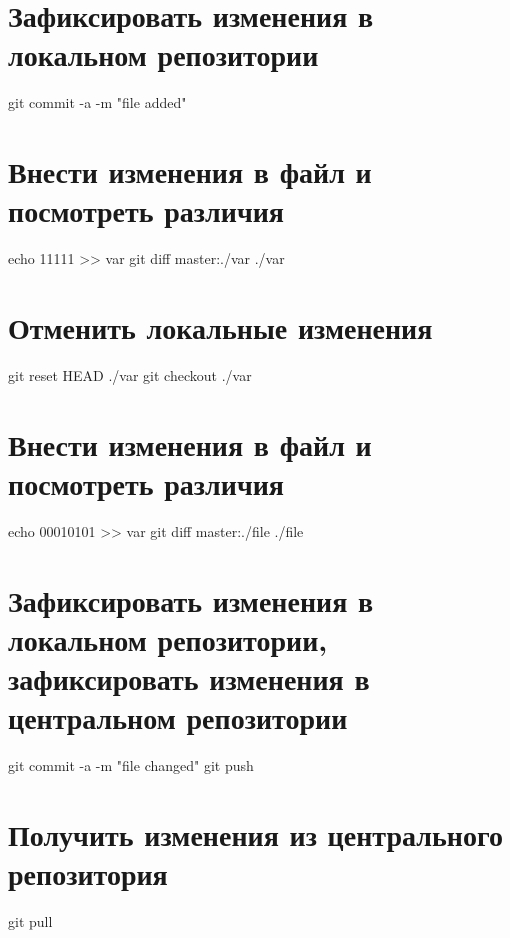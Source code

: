 \documentclass{article}
\begin{document}
\section[3]{Зафиксировать изменения в локальном репозитории}

\begin{verbatim*}
git commit -a -m "file added"
\end{verbatim*}

\section[4]{Внести изменения в файл и посмотреть различия}

\begin{verbatim*}
echo 11111 >> var
git diff master:./var ./var
\end{verbatim*}

\section[5]{Отменить локальные изменения}

\begin{verbatim*}
git reset HEAD ./var
git checkout ./var
\end{verbatim*}

\section[6]{Внести изменения в файл и посмотреть различия}

\begin{verbatim*}
echo 00010101 >> var
git diff master:./file ./file
\end{verbatim*}

\section[7]{Зафиксировать изменения в локальном репозитории, зафиксировать изменения в центральном репозитории}

\begin{verbatim*}
git commit -a -m "file changed"
git push
\end{verbatim*}

\section[8]{Получить изменения из центрального репозитория}

\begin{verbatim*}
git pull
\end{verbatim*}
\end{document}
